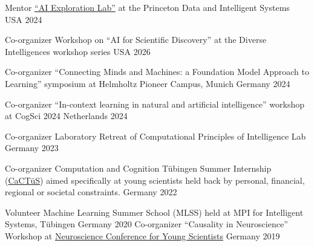 
\begin{cvhonors}

  \cvhonor
    {Mentor} %
    {\href{https://ai-exploration-lab.vercel.app/}{``AI Exploration Lab''} at the Princeton Data and Intelligent Systems} %
    {USA} %
    {2024} %

    
  \cvhonor
    {Co-organizer} %
    {Workshop on ``AI for Scientific Discovery'' at the Diverse Intelligences workshop series} %
    {USA} %
    {2026} %

    
  \cvhonor
    {Co-organizer} %
    {``Connecting Minds and Machines: a Foundation Model Approach to Learning'' symposium at Helmholtz Pioneer Campus, Munich} %
    {Germany} %
    {2024} %
    
  \cvhonor
    {Co-organizer} %
    {``In-context learning in natural and artificial intelligence'' workshop at CogSci 2024} %
    {Netherlands} %
    {2024} %
    
  \cvhonor
    {Co-organizer} %
    {Laboratory Retreat of Computational Principles of Intelligence Lab} %
    {Germany} %
    {2023} %

    \cvhonor
    {Co-organizer} %
    {Computation and Cognition Tübingen Summer Internship (\href{https://www.projects.tuebingen.mpg.de/}{CaCTüS}) aimed specifically at young scientists held back by personal, financial, regional or societal constraints.} %
    {Germany} %
    {2022} %


    \cvhonor
    {Volunteer} %
    {Machine Learning Summer School (MLSS) held at MPI for Intelligent Systems, Tübingen} %
    {Germany} %
    {2020} %
    \cvhonor
    {Co-organizer} %
    {``Causality in Neuroscience'' Workshop at \href{https://nenaconference.wordpress.com/wp-content/uploads/2019/10/schedule_nena2019.pdf}{Neuroscience Conference for Young Scientists}} %
    {Germany} %
    {2019} %

    \vspace{3mm}
\end{cvhonors}
